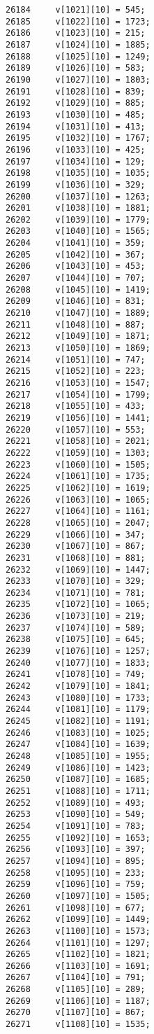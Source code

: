 \begin{Code}
\begin{verbatim}
26184     v[1021][10] = 545;
26185     v[1022][10] = 1723;
26186     v[1023][10] = 215;
26187     v[1024][10] = 1885;
26188     v[1025][10] = 1249;
26189     v[1026][10] = 583;
26190     v[1027][10] = 1803;
26191     v[1028][10] = 839;
26192     v[1029][10] = 885;
26193     v[1030][10] = 485;
26194     v[1031][10] = 413;
26195     v[1032][10] = 1767;
26196     v[1033][10] = 425;
26197     v[1034][10] = 129;
26198     v[1035][10] = 1035;
26199     v[1036][10] = 329;
26200     v[1037][10] = 1263;
26201     v[1038][10] = 1881;
26202     v[1039][10] = 1779;
26203     v[1040][10] = 1565;
26204     v[1041][10] = 359;
26205     v[1042][10] = 367;
26206     v[1043][10] = 453;
26207     v[1044][10] = 707;
26208     v[1045][10] = 1419;
26209     v[1046][10] = 831;
26210     v[1047][10] = 1889;
26211     v[1048][10] = 887;
26212     v[1049][10] = 1871;
26213     v[1050][10] = 1869;
26214     v[1051][10] = 747;
26215     v[1052][10] = 223;
26216     v[1053][10] = 1547;
26217     v[1054][10] = 1799;
26218     v[1055][10] = 433;
26219     v[1056][10] = 1441;
26220     v[1057][10] = 553;
26221     v[1058][10] = 2021;
26222     v[1059][10] = 1303;
26223     v[1060][10] = 1505;
26224     v[1061][10] = 1735;
26225     v[1062][10] = 1619;
26226     v[1063][10] = 1065;
26227     v[1064][10] = 1161;
26228     v[1065][10] = 2047;
26229     v[1066][10] = 347;
26230     v[1067][10] = 867;
26231     v[1068][10] = 881;
26232     v[1069][10] = 1447;
26233     v[1070][10] = 329;
26234     v[1071][10] = 781;
26235     v[1072][10] = 1065;
26236     v[1073][10] = 219;
26237     v[1074][10] = 589;
26238     v[1075][10] = 645;
26239     v[1076][10] = 1257;
26240     v[1077][10] = 1833;
26241     v[1078][10] = 749;
26242     v[1079][10] = 1841;
26243     v[1080][10] = 1733;
26244     v[1081][10] = 1179;
26245     v[1082][10] = 1191;
26246     v[1083][10] = 1025;
26247     v[1084][10] = 1639;
26248     v[1085][10] = 1955;
26249     v[1086][10] = 1423;
26250     v[1087][10] = 1685;
26251     v[1088][10] = 1711;
26252     v[1089][10] = 493;
26253     v[1090][10] = 549;
26254     v[1091][10] = 783;
26255     v[1092][10] = 1653;
26256     v[1093][10] = 397;
26257     v[1094][10] = 895;
26258     v[1095][10] = 233;
26259     v[1096][10] = 759;
26260     v[1097][10] = 1505;
26261     v[1098][10] = 677;
26262     v[1099][10] = 1449;
26263     v[1100][10] = 1573;
26264     v[1101][10] = 1297;
26265     v[1102][10] = 1821;
26266     v[1103][10] = 1691;
26267     v[1104][10] = 791;
26268     v[1105][10] = 289;
26269     v[1106][10] = 1187;
26270     v[1107][10] = 867;
26271     v[1108][10] = 1535;

\end{verbatim}
\end{Code}
